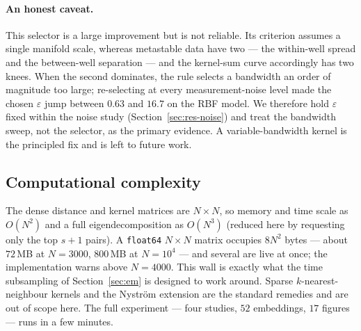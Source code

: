 \documentclass[11pt]{article}
\newcommand{\eps}{\varepsilon}
\begin{document}
\paragraph{An honest caveat.}
This selector is a large improvement but is not reliable. Its criterion assumes a
single manifold scale, whereas metastable data have two --- the within-well
spread and the between-well separation --- and the kernel-sum curve accordingly
has two knees. When the second dominates, the rule selects a bandwidth an order
of magnitude too large; re-selecting at every measurement-noise level made the
chosen $\eps$ jump between $0.63$ and $16.7$ on the RBF model. We therefore hold
$\eps$ fixed within the noise study (Section~\ref{sec:res-noise}) and treat the
bandwidth sweep, not the selector, as the primary evidence. A variable-bandwidth
kernel \citep{berry2016variable,rohrdanz2011determination} is the principled fix
and is left to future work.

\subsection{Computational complexity}
\label{sec:complexity}

The dense distance and kernel matrices are $N\times N$, so memory and time scale
as $O(N^2)$ and a full eigendecomposition as $O(N^3)$ (reduced here by requesting
only the top $s+1$ pairs). A \texttt{float64} $N\times N$ matrix occupies $8N^2$
bytes --- about $72$\,MB at $N=3000$, $800$\,MB at $N=10^4$ --- and several are
live at once; the implementation warns above $N=4000$. This wall is exactly what
the time subsampling of Section~\ref{sec:em} is designed to work around. Sparse
$k$-nearest-neighbour kernels and the Nystr\"om extension
\citep{fowlkes2004spectral} are the standard remedies and are out of scope here.
The full experiment --- four studies, $52$ embeddings, $17$ figures --- runs in a
few minutes.
\end{document}
